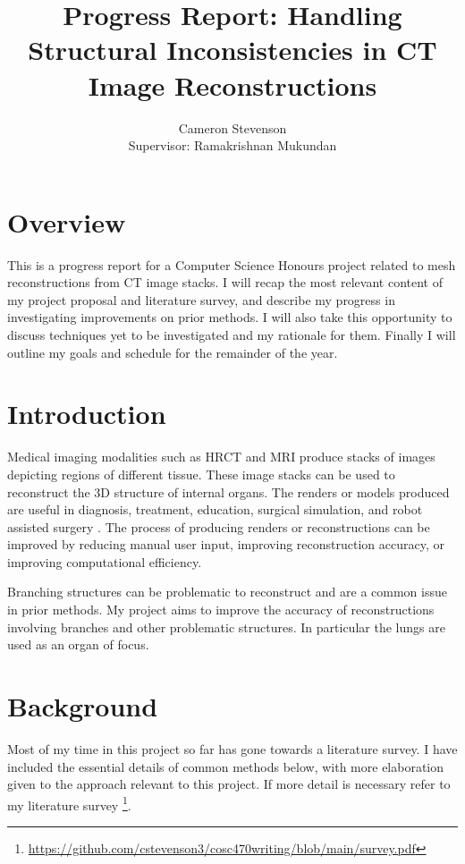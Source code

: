 \documentclass[10pt]{article}
\title{Progress Report: Handling Structural Inconsistencies in CT Image Reconstructions}
\author{Cameron Stevenson\\[0.5cm]{\small Supervisor: Ramakrishnan Mukundan}}
\begin{document}
\maketitle

\section{Overview}

This is a progress report for a Computer Science Honours project related to mesh reconstructions from CT image stacks. I will recap the most relevant content of my project proposal and literature survey, and describe my progress in investigating improvements on prior methods. I will also take this opportunity to discuss techniques yet to be investigated and my rationale for them. Finally I will outline my goals and schedule for the remainder of the year.

\section{Introduction}

Medical imaging modalities such as HRCT and MRI produce stacks of images depicting regions of different tissue. These image stacks can be used to reconstruct the 3D structure of internal organs. The renders or models produced are useful in diagnosis, treatment, education, surgical simulation, and robot assisted surgery \cite{mackay2019robust, mukundan2016reconstruction, pan2017comparison}. The process of producing renders or reconstructions can be improved by reducing manual user input, improving reconstruction accuracy, or improving computational efficiency.

Branching structures can be problematic to reconstruct and are a common issue in prior methods. My project aims to improve the accuracy of reconstructions involving branches and other problematic structures. In particular the lungs are used as an organ of focus. 

\section{Background}

Most of my time in this project so far has gone towards a literature survey. I have included the essential details of common methods below, with more elaboration given to the approach relevant to this project. If more detail is necessary refer to my literature survey \footnote{\url{https://github.com/cstevenson3/cosc470writing/blob/main/survey.pdf}}.
\end{document}
